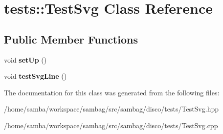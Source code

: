 \hypertarget{classtests_1_1_test_svg}{
\section{tests::TestSvg Class Reference}
\label{classtests_1_1_test_svg}
}
\subsection*{Public Member Functions}
\begin{DoxyCompactItemize}
\item 
\hypertarget{classtests_1_1_test_svg_a39006df874d535ed8c71c90842fa106f}{
void {\bfseries setUp} ()}
\label{classtests_1_1_test_svg_a39006df874d535ed8c71c90842fa106f}

\item 
\hypertarget{classtests_1_1_test_svg_a3e1531286be6d26ab60bb6ad81b582fa}{
void {\bfseries testSvgLine} ()}
\label{classtests_1_1_test_svg_a3e1531286be6d26ab60bb6ad81b582fa}

\end{DoxyCompactItemize}


The documentation for this class was generated from the following files:\begin{DoxyCompactItemize}
\item 
/home/samba/workspace/sambag/src/sambag/disco/tests/TestSvg.hpp\item 
/home/samba/workspace/sambag/src/sambag/disco/tests/TestSvg.cpp\end{DoxyCompactItemize}
